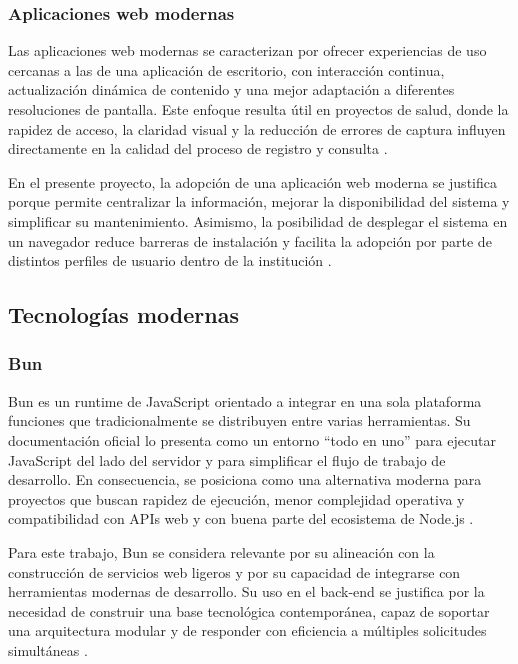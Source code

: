 \subsubsection{Aplicaciones web modernas}

Las aplicaciones web modernas se caracterizan por ofrecer experiencias de uso cercanas a las de una aplicación de escritorio, con interacción continua, actualización dinámica de contenido y una mejor adaptación a diferentes resoluciones de pantalla. Este enfoque resulta útil en proyectos de salud, donde la rapidez de acceso, la claridad visual y la reducción de errores de captura influyen directamente en la calidad del proceso de registro y consulta \cite{nextjs2025docs,react2025docs,mdn2025accessibility}.

En el presente proyecto, la adopción de una aplicación web moderna se justifica porque permite centralizar la información, mejorar la disponibilidad del sistema y simplificar su mantenimiento. Asimismo, la posibilidad de desplegar el sistema en un navegador reduce barreras de instalación y facilita la adopción por parte de distintos perfiles de usuario dentro de la institución \cite{nextjs2025docs,who2025digitalhealth}.

\subsection{Tecnologías modernas}

\subsubsection{Bun}

Bun es un runtime de JavaScript orientado a integrar en una sola plataforma funciones que tradicionalmente se distribuyen entre varias herramientas. Su documentación oficial lo presenta como un entorno “todo en uno” para ejecutar JavaScript del lado del servidor y para simplificar el flujo de trabajo de desarrollo. En consecuencia, se posiciona como una alternativa moderna para proyectos que buscan rapidez de ejecución, menor complejidad operativa y compatibilidad con APIs web y con buena parte del ecosistema de Node.js \cite{bun2025docs}.

Para este trabajo, Bun se considera relevante por su alineación con la construcción de servicios web ligeros y por su capacidad de integrarse con herramientas modernas de desarrollo. Su uso en el back-end se justifica por la necesidad de construir una base tecnológica contemporánea, capaz de soportar una arquitectura modular y de responder con eficiencia a múltiples solicitudes simultáneas \cite{bun2025docs,hono2025docs}.

